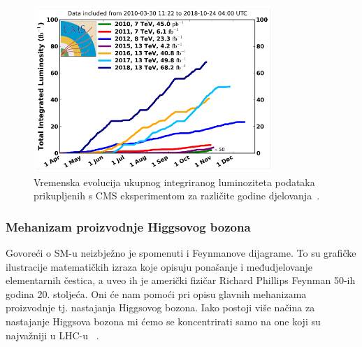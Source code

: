 \documentclass[12pt,a4paper,oneside]{article}
\begin{document}
\begin{linenumbers}
			\begin{figure}[H]
			\centering
			\includegraphics[width=0.8\textwidth]{luminozitet.png}
			\caption[Vremenska evolucija ukupnog integriranog luminoziteta podataka prikupljenih s CMS eksperimentom za različite godine djelovanja.~\cite{doktorat}]{\label{sl:luminozitet}Vremenska evolucija ukupnog integriranog luminoziteta podataka prikupljenih s CMS eksperimentom za različite godine djelovanja~\cite{doktorat}. }
		\end{figure}
		\subsubsection{Mehanizam proizvodnje Higgsovog bozona}
		Govoreći o SM-u neizbježno je spomenuti i Feynmanove dijagrame. To su grafičke ilustracije matematičkih izraza koje opisuju ponašanje i međudjelovanje elementarnih čestica, a uveo ih je američki fizičar Richard Phillips Feynman 50-ih godina 20. stoljeća. Oni će nam pomoći pri opisu glavnih mehanizama proizvodnje tj. nastajanja Higgsovog bozona. Iako postoji više načina za nastajanje Higgsova bozona mi ćemo se koncentrirati samo na one koji su najvažniji u LHC-u ~\cite{doktorat}.
		

\end{linenumbers}
\end{document}
